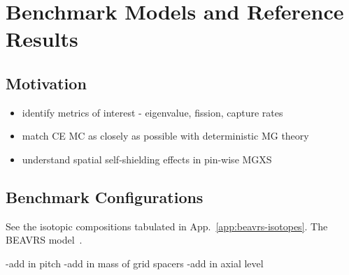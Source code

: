 \chapter{Benchmark Models and Reference Results}
\label{chap:benchmarks}

\section{Motivation}
\label{sec:chap7-motivate}

\begin{itemize}[noitemsep]
  \item identify metrics of interest - eigenvalue, fission, capture rates
  \item match CE MC as closely as possible with deterministic MG theory
  \item understand spatial self-shielding effects in pin-wise MGXS
\end{itemize}


\section{Benchmark Configurations}
\label{sec:chap7-benchmarks}

See the isotopic compositions tabulated in App.~\ref{app:beavrs-isotopes}. The \ac{BEAVRS} model~\cite{horelik2013beavrs}.

-add in pitch
-add in mass of grid spacers
-add in axial level


